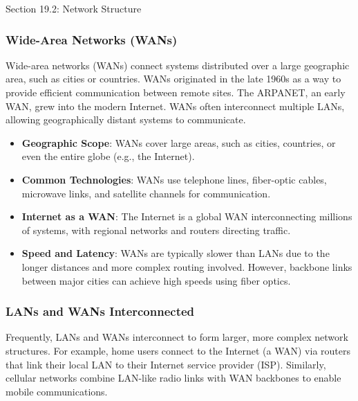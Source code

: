 \begin{notes}{Section 19.2: Network Structure}
\begin{highlight}
    \end{highlight}
    
    \subsubsection*{Wide-Area Networks (WANs)}
    
    Wide-area networks (WANs) connect systems distributed over a large geographic area, such as cities or countries. WANs originated in the late 1960s as a way to provide efficient communication between 
    remote sites. The ARPANET, an early WAN, grew into the modern Internet. WANs often interconnect multiple LANs, allowing geographically distant systems to communicate.
    
    \begin{highlight}
    
        \begin{itemize}
            \item \textbf{Geographic Scope}: WANs cover large areas, such as cities, countries, or even the entire globe (e.g., the Internet).
            \item \textbf{Common Technologies}: WANs use telephone lines, fiber-optic cables, microwave links, and satellite channels for communication.
            \item \textbf{Internet as a WAN}: The Internet is a global WAN interconnecting millions of systems, with regional networks and routers directing traffic.
            \item \textbf{Speed and Latency}: WANs are typically slower than LANs due to the longer distances and more complex routing involved. However, backbone links between major cities can achieve 
            high speeds using fiber optics.
        \end{itemize}
    
    \end{highlight}
    
    \subsubsection*{LANs and WANs Interconnected}
    
    Frequently, LANs and WANs interconnect to form larger, more complex network structures. For example, home users connect to the Internet (a WAN) via routers that link their local LAN to their Internet 
    service provider (ISP). Similarly, cellular networks combine LAN-like radio links with WAN backbones to enable mobile communications.
    

\end{notes}
